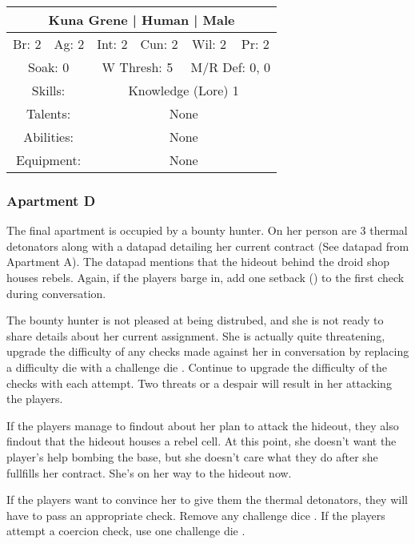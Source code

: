 \documentclass[letterpaper]{article}
\begin{document}
\begin{center}
\begin{tabular}{| c c c c c c |}
    \hline
    \multicolumn{6}{|c|}{Kuna Grene | Human | Male} \\
    \hline
    Br: 2 & Ag: 2 & Int: 2 & Cun: 2 & Wil: 2 & Pr: 2 \\[2mm]
    \multicolumn{2}{|c}{Soak: 0} & \multicolumn{2}{c}{W Thresh: 5} & \multicolumn{2}{c|}{M/R Def: 0, 0} \\
    \hline
    \multicolumn{2}{|c}{Skills:} & \multicolumn{4}{p{5cm}|}{Knowledge (Lore) 1} \\
    \multicolumn{2}{|c}{Talents:} & \multicolumn{4}{p{5cm}|}{None} \\
    \multicolumn{2}{|c}{Abilities:} & \multicolumn{4}{p{5cm}|}{None} \\
    \multicolumn{2}{|c}{Equipment:} & \multicolumn{4}{p{5cm}|}{None} \\
    \hline
\end{tabular}
\end{center}

\subsubsection{Apartment D}

The final apartment is occupied by a bounty hunter. On her person are 3 thermal detonators along with a datapad detailing her current contract (See datapad from Apartment A). The datapad mentions that the hideout behind the droid shop houses rebels. Again, if the players barge in, add one setback (\setback) to the first check during conversation.

The bounty hunter is not pleased at being distrubed, and she is not ready to share details about her current assignment. She is actually quite threatening, upgrade the difficulty of any checks made against her in conversation by replacing a difficulty die \difficulty with a challenge die \challenge. Continue to upgrade the difficulty of the checks with each attempt. Two threats \threat\threat or a despair \despair will result in her attacking the players.

If the players manage to findout about her plan to attack the hideout, they also findout that the hideout houses a rebel cell. At this point, she doesn't want the player's help bombing the base, but she doesn't care what they do after she fullfills her contract. She's on her way to the hideout now.

If the players want to convince her to give them the thermal detonators, they will have to pass an appropriate check. Remove any challenge dice \challenge. If the players attempt a coercion check, use one challenge die \challenge.
\end{document}
